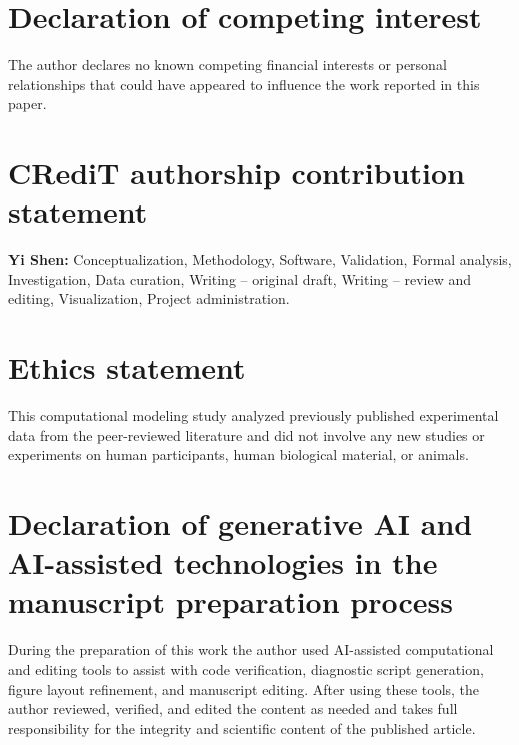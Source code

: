 \documentclass[final,5p,times]{elsarticle}
\begin{document}
\section*{Declaration of competing interest}
The author declares no known competing financial interests or personal relationships that could have appeared to influence the work reported in this paper.

\section*{CRediT authorship contribution statement}
\textbf{Yi Shen:} Conceptualization, Methodology, Software, Validation, Formal analysis, Investigation, Data curation, Writing -- original draft, Writing -- review and editing, Visualization, Project administration.

\section*{Ethics statement}
This computational modeling study analyzed previously published experimental data from the peer-reviewed literature and did not involve any new studies or experiments on human participants, human biological material, or animals.

\section*{Declaration of generative AI and AI-assisted technologies in the manuscript preparation process}
During the preparation of this work the author used AI-assisted computational and editing tools to assist with code verification, diagnostic script generation, figure layout refinement, and manuscript editing. After using these tools, the author reviewed, verified, and edited the content as needed and takes full responsibility for the integrity and scientific content of the published article.

\clearpage
\onecolumn


\end{document}
